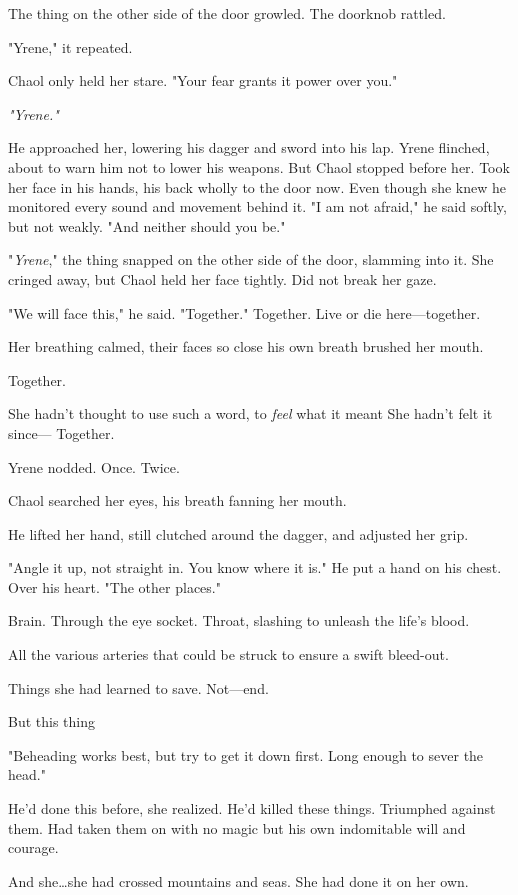 The thing on the other side of the door growled.
The doorknob rattled.

"Yrene," it repeated.

Chaol only held her stare.
"Your fear grants it power over you."

\emph{"Yrene."}

He approached her, lowering his dagger and sword into his lap.
Yrene flinched, about to warn him not to lower his weapons.
But Chaol stopped before her.
Took her face in his hands, his back wholly to the door now.
Even though she knew he monitored every sound and movement behind it.
"I am not afraid," he said softly, but not weakly.
"And neither should you be."

"\emph{Yrene}," the thing snapped on the other side of the door, slamming into it.
She cringed away, but Chaol held her face tightly.
Did not break her gaze.

"We will face this," he said.
"Together."
Together.
Live or die here---together.

Her breathing calmed, their faces so close his own breath brushed her mouth.

Together.

She hadn't thought to use such a word, to \emph{feel} what it meant  She hadn't felt it since--- Together.

Yrene nodded.
Once.
Twice.

Chaol searched her eyes, his breath fanning her mouth.

He lifted her hand, still clutched around the dagger, and adjusted her grip.

"Angle it up, not straight in.
You know where it is."
He put a hand on his chest.
Over his heart.
"The other places."

Brain.
Through the eye socket.
Throat, slashing to unleash the life's blood.

All the various arteries that could be struck to ensure a swift bleed-out.

Things she had learned to save.
Not---end.

But this thing 

"Beheading works best, but try to get it down first.
Long enough to sever the head."

He'd done this before, she realized.
He'd killed these things.
Triumphed against them.
Had taken them on with no magic but his own indomitable will and courage.

And she\ldots she had crossed mountains and seas.
She had done it on her own.

